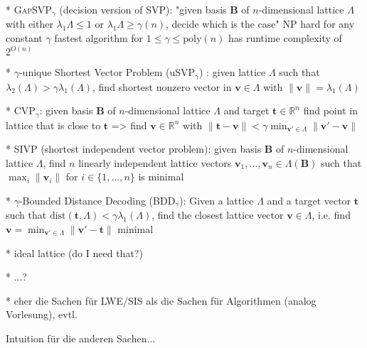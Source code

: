 \documentclass[
  a4paper,  %
  twoside,  %
  bibliography=totoc,
  headsepline,
  cleardoublepage=empty,
  parskip=half,
  draft=false
]{scrbook}
\begin{document}
  * \textsc{GapSVP}$_\gamma$ (decision version of \textsc{SVP}): "given basis $\mathbf{B}$ of $n$-dimensional lattice $\Lambda$ with either $\lambda_1{\Lambda} \leq 1$ or $\lambda_1{\Lambda} \geq \gamma(n)$, decide which is the case" %
    NP hard for any constant $\gamma$ %
    fastest algorithm for $1\leq \gamma \leq \text{poly}(n)$ has runtime complexity of $2^{O(n)}$
  
  * $\gamma$-unique Shortest Vector Problem (uSVP$_\gamma$) \cite{LM09}: given lattice $\Lambda$ such that $\lambda_2(\Lambda) > \gamma \lambda_1(\Lambda)$, find shortest nonzero vector in $\mathbf{v} \in \Lambda$ with $\|\mathbf{v}\| = \lambda_1(\Lambda)$

  * CVP$_\gamma$: given  basis $\mathbf{B}$ of $n$-dimensional lattice $\Lambda$ and target $\mathbf{t}\in\mathbb{R}^n$ find point in lattice that is close to $\mathbf{t}$ => find  $\mathbf{v} \in \mathbb{R}^n$ with $\|\mathbf{t} - \mathbf{v}\| < \gamma \min_{\mathbf{v}' \in \Lambda} \|\mathbf{v}' - \mathbf{v}\|$

  * \textsc{SIVP} (shortest independent vector problem): given  basis $\mathbf{B}$ of $n$-dimensional lattice $\Lambda$, find $n$ linearly independent lattice vectors $\mathbf{v}_1, \ldots, \mathbf{v}_n \in \Lambda(\mathbf{B})$ such that $\max_i \|\mathbf{v}_i\|$ for $i \in \{1, \ldots, n\}$ is minimal

  * $\gamma$-Bounded Distance Decoding (BDD$_\gamma$): Given a lattice $\Lambda$ and a target vector $\mathbf{t}$ such that $\text{dist}(\mathbf{t}, \Lambda) < \gamma \lambda_1(\Lambda)$, find the closest lattice vector $\mathbf{v} \in \Lambda$, i.e. find $\mathbf{v} = \min_{\mathbf{v}' \in \Lambda} \|\mathbf{v}' - \mathbf{t}\|$ minimal \cite{LM09}


  * ideal lattice (do I need that?)

  * ...?

  * eher die Sachen für LWE/SIS als die Sachen für Algorithmen (analog Vorlesung), evtl. 
  
  Intuition für die anderen Sachen...
\end{document}
